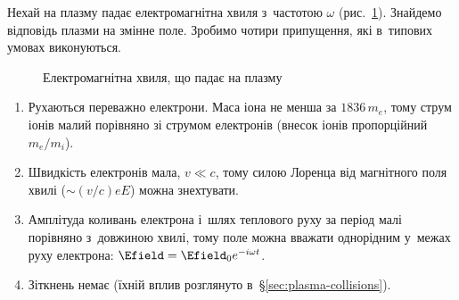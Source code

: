 Нехай на плазму падає електромагнітна хвиля з~частотою $\omega$ (рис.~\ref{tikz:emwave}).
Знайдемо відповідь плазми на змінне поле. Зробимо чотири припущення, які в~типових умовах
виконуються.

\begin{figure}[h!]\centering
	\caption{Електромагнітна хвиля, що падає на плазму}
	\label{tikz:emwave}
\end{figure}
\begin{enumerate}
	\item Рухаються переважно електрони. Маса іона не менша за $1836\,m_e$, тому струм
	      іонів малий порівняно зі струмом електронів (внесок іонів пропорційний $m_e/m_i$).
	\item Швидкість електронів мала, $v\ll c$, тому силою Лоренца від магнітного поля
	      хвилі ($\sim(v/c)eE$) можна знехтувати.
	\item Амплітуда коливань електрона і~шлях теплового руху за період малі порівняно
	      з~довжиною хвилі, тому поле можна вважати однорідним у~межах руху електрона:
	      $\Efield=\Efield_0e^{-i\omega t}$.
	\item Зіткнень немає (їхній вплив розглянуто в~§\ref{sec:plasma-collisions}).
\end{enumerate}

